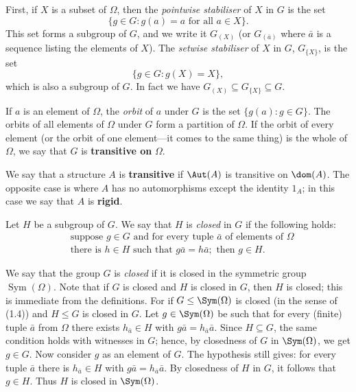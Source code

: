 First, if $X$ is a subset of $\Omega$, then the \textit{pointwise stabiliser} of $X$ in $G$ is the set
\[
    \{ g \in G : g(a) = a \text{ for all } a \in X \}.
\]
This set forms a subgroup of $G$, and we write it $G_{(X)}$ (or $G_{(\bar{a})}$ where $\bar{a}$ is a sequence listing the elements of $X$).
The \textit{setwise stabiliser} of $X$ in $G$, $G_{\{X\}}$, is the set
\[
    \{ g \in G : g(X) = X \},
\]
which is also a subgroup of $G$. In fact we have $G_{(X)} \subseteq G_{\{X\}} \subseteq G$.

If $a$ is an element of $\Omega$, the \textit{orbit} of $a$ under $G$ is the set $\{ g(a) : g \in G \}$.
The orbits of all elements of $\Omega$ under $G$ form a partition of $\Omega$. If the orbit of every element (or the orbit of one element—it comes to the same thing) is the whole of $\Omega$, we say that $G$ is \textbf{transitive on} $\Omega$.

We say that a structure $A$ is \textbf{transitive} if $\Aut(A)$ is transitive on $\dom(A)$.
The opposite case is where $A$ has no automorphisms except the identity $1_A$; in this case we say that $A$ is \textbf{rigid}.



Let $H$ be a subgroup of $G$. We say that $H$ is \emph{closed} in $G$ if the following holds:
\begin{equation*}
    \begin{aligned}
         & \text{suppose } g \in G \text{ and for every tuple } \bar{a} \text{ of elements of } \Omega \\
         & \text{there is } h \in H \text{ such that } g\bar{a} = h\bar{a}; \text{ then } g \in H.
    \end{aligned}\tag{1.4}
\end{equation*}


We say that the group $G$ is \emph{closed} if it is closed in the symmetric group $\operatorname{Sym}(\Omega)$. Note that if $G$ is closed and $H$ is closed in $G$, then $H$ is closed; this is immediate from the definitions. For if $G\le\Sym(\Omega)$ is closed (in the sense of (1.4)) and $H\le G$ is closed in $G$. Let $g\in\Sym(\Omega)$ be such that for every (finite) tuple $\bar a$ from $\Omega$ there exists $h_{\bar a}\in H$ with $g\bar a=h_{\bar a}\bar a$. Since $H\subseteq G$, the same condition holds with witnesses in $G$; hence, by closedness of $G$ in $\Sym(\Omega)$, we get $g\in G$.   Now consider $g$ as an element of $G$. The hypothesis still gives: for every tuple $\bar a$ there is $h_{\bar a}\in H$ with $g\bar a=h_{\bar a}\bar a$.  By closedness of $H$ in $G$, it follows that $g\in H$. Thus $H$ is closed in $\Sym(\Omega)$.


